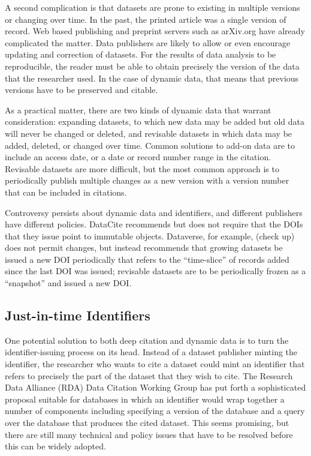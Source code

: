 \documentclass[10pt,a4paper,twocolumn]{article}
\begin{document}
A second complication is that datasets are prone to existing in multiple versions or changing over time. %
In the past, the printed article was a single version of record.
Web based publishing and preprint servers such as arXiv.org have already complicated the matter.
Data publishers are likely to allow or even encourage updating and correction of datasets.  
For the results of data analysis to be reproducible, the reader must be able to obtain precisely the version of the data that the researcher used. 
In the case of dynamic data, that means that previous versions have to be preserved and citable.

As a practical matter, there are two kinds of dynamic data that warrant consideration: expanding datasets, to which new data may be added but old data will never be changed or deleted, and revisable datasets in which data may be added, deleted, or changed over time. 
Common solutions to add-on data are to include an access date, or a date or record number range in the citation. 
Revisable datasets are more difficult, but the most common approach is to periodically publish multiple changes as a new version with a version number that can be included in citations.

Controversy persists about dynamic data and identifiers, and different publishers have different policies. 
DataCite recommends but does not require that the DOIs that they issue point to immutable objects. 
Dataverse, for example, (check up) does not permit changes, but instead recommends that growing datasets be issued a new DOI periodically that refers to the ``time-slice'' of records added since the last DOI was issued; revisable datasets are to be periodically frozen as a ``snapshot'' and issued a new DOI.

\subsection*{Just-in-time Identifiers}\label{just-in-time-identifiers}

One potential solution to both deep citation and dynamic data is to turn the identifier-issuing process on its head. 
Instead of a dataset publisher minting the identifier, the researcher who wants to cite a dataset could mint an identifier that refers to precisely the part of the dataset that they wish to cite. 
The Research Data Alliance (RDA) Data Citation Working Group has put forth a sophisticated proposal suitable for databases in which an identifier would wrap together a number of components including specifying a version of the database and a query over the database that produces the cited dataset. 
This seems promising, but there are still many technical and policy issues that have to be resolved before this can be widely adopted.
\end{document}
